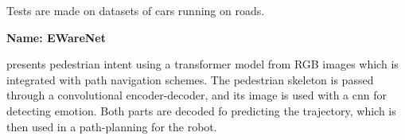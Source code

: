 Tests are made on datasets of cars running on roads.


\textbf{Name: EWareNet}

\cite{narayanan2023ewarenet} presents pedestrian intent using a transformer model from RGB images which is integrated with path navigation schemes.
%
The pedestrian skeleton is passed through a convolutional encoder-decoder, and its image is used with a \gls{cnn} for detecting emotion. 
%
Both parts are decoded fo predicting the trajectory, which is then used in a path-planning for the robot.


